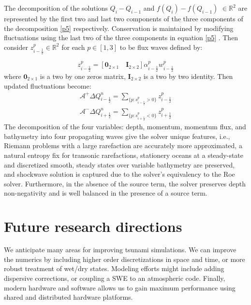 \documentclass[10pt,a4paper]{article}
\newcommand{\donna}[1]{{\color{red}{#1}}}
\begin{document}
	The decomposition of the solutions $Q_{i} - Q_{i-1} $  and  $f(Q_{i}) - f(Q_{i-1})$ $ \in  \mathbb{R}^{2}$ are represented by the first two and last two components of the three components of the decomposition \eqref{p5} respectively.  Conservation is maintained by modifying fluctuations using the last two of the three components  in equation \eqref{p5} . Then  consider $z_{i-\frac{1}{2}}^{p} \in \mathbb{R}^{2}$ for each $p \in [1,3]$ to be flux waves defined by:
	

	\begin{equation}
		z_{i-\frac{1}{2}}^{p} = [\mathbf{0}_{2\times1} \quad \mathbf{I}_{2\times2}] \alpha_{i-\frac{1}{2}}^{p} w_{i-\frac{1}{2}}^{p}
	\end{equation}
	where $\mathbf{0}_{2\times1}$ is a two by one zeros matrix, $\mathbf{I}_{2\times2}$ is a two by two identity. Then updated fluctuations become:
	\begin{eqnarray}
		\mathcal{A^{+}}\Delta Q_{i-\frac{1}{2}}^{n} = \sum_{\{ p:s_{i-\frac{1}{2}}^{p}>0\}}  z_{i-\frac{1}{2}}^{p}
		\label{p7}\\
		\mathcal{A^{-}}\Delta Q_{i+\frac{1}{2}}^{n} = \sum_{\{ p:s_{i+\frac{1}{2}}^{p}<0\}} z_{i+\frac{1}{2}}^{p}
		\label{p8}
	\end{eqnarray}
The decomposition of the four variables: depth, momentum, momentum flux, and bathymetry into four propagating waves give the solver unique features, i.e.,  Riemann problems with a large rarefaction are accurately more approximated, a natural entropy fix for transonic rarefactions,  stationery oceans at a steady-state and discretized smooth, steady states over variable bathymetry are preserved, and shockwave solution is captured due to the solver's equivalency to the Roe solver.
Furthermore, in the absence of the source term, the solver preserves depth non-negativity and is well balanced in the presence of a source term.  


	\section{ Future research directions}

We anticipate many areas for improving tsunami simulations.  We can improve the numerics by including higher order discretizations in space and time, or more robust treatment of  wet/dry states. Modeling efforts might include adding dispersive corrections, or coupling a SWE to an atmospheric code.   Finally, modern hardware and software allows us to gain maximum performance using shared and distributed hardware  platforms. 
\end{document}
